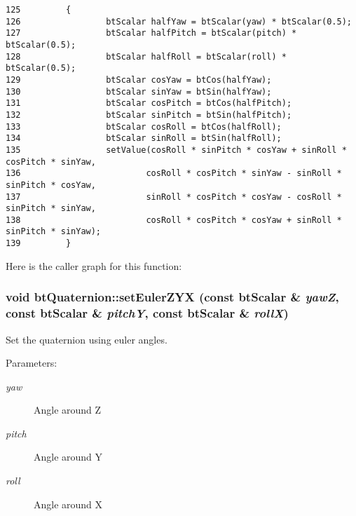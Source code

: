\begin{Code}\begin{verbatim}125         {
126                 btScalar halfYaw = btScalar(yaw) * btScalar(0.5);  
127                 btScalar halfPitch = btScalar(pitch) * btScalar(0.5);  
128                 btScalar halfRoll = btScalar(roll) * btScalar(0.5);  
129                 btScalar cosYaw = btCos(halfYaw);
130                 btScalar sinYaw = btSin(halfYaw);
131                 btScalar cosPitch = btCos(halfPitch);
132                 btScalar sinPitch = btSin(halfPitch);
133                 btScalar cosRoll = btCos(halfRoll);
134                 btScalar sinRoll = btSin(halfRoll);
135                 setValue(cosRoll * sinPitch * cosYaw + sinRoll * cosPitch * sinYaw,
136                         cosRoll * cosPitch * sinYaw - sinRoll * sinPitch * cosYaw,
137                         sinRoll * cosPitch * cosYaw - cosRoll * sinPitch * sinYaw,
138                         cosRoll * cosPitch * cosYaw + sinRoll * sinPitch * sinYaw);
139         }
\end{verbatim}
\end{Code}




Here is the caller graph for this function:\hypertarget{classbt_quaternion_df15384cff65f630b0537f1b8aeee622}{
\subsubsection[setEulerZYX]{\setlength{\rightskip}{0pt plus 5cm}void btQuaternion::setEulerZYX (const btScalar \& {\em yawZ}, \/  const btScalar \& {\em pitchY}, \/  const btScalar \& {\em rollX})}}
\label{classbt_quaternion_df15384cff65f630b0537f1b8aeee622}


Set the quaternion using euler angles. 

\begin{Desc}
\item[Parameters:]
\begin{description}
\item[{\em yaw}]Angle around Z \item[{\em pitch}]Angle around Y \item[{\em roll}]Angle around X \end{description}
\end{Desc}


